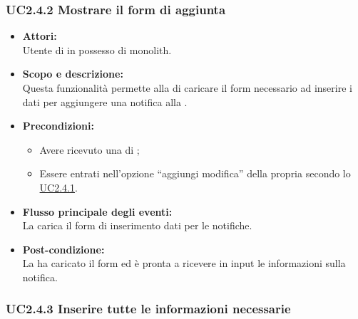 \subsubsection{UC2.4.2 Mostrare il form di aggiunta} \label{UC2.4.2}

\begin{itemize}
	\item \textbf{Attori:}
	\\Utente di  in possesso di monolith.
	\item \textbf{Scopo e descrizione:} 
	\\Questa funzionalità permette alla  di caricare il form necessario ad inserire i dati per aggiungere una notifica alla .
	\item \textbf{Precondizioni:}
	\begin{itemize}
		\item Avere ricevuto una  di ;
		\item Essere entrati nell'opzione “aggiungi modifica” della propria  secondo lo \hyperref[UC2.4.1]{UC2.4.1}.
	\end{itemize}
	\item \textbf{Flusso principale degli eventi:}
	\\La {}  carica il form di inserimento dati per le notifiche.
	\item \textbf{Post-condizione:}
	\\La {} ha caricato il form ed è pronta a ricevere in input le informazioni sulla notifica.
\end{itemize}

\subsubsection{UC2.4.3 Inserire tutte le informazioni necessarie} \label{UC2.4.3}

